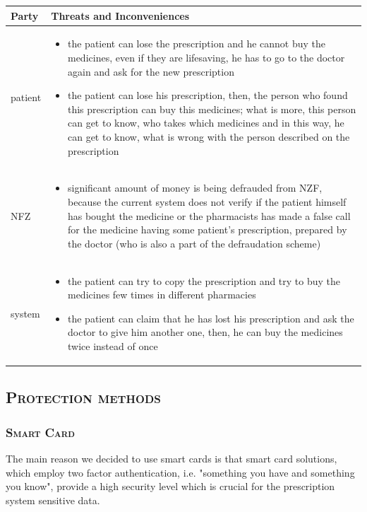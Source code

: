 \documentclass[12pt,titlepage]{article}
\begin{document}
\begin{tabularx}{\textwidth}{ |p{2.5cm}|X| }
	\hline
	\textbf{Party} &  \textbf{Threats and Inconveniences}\\
	\hline	
patient & \begin{itemize}
\item the patient can lose the prescription and he cannot buy the medicines, even if they are lifesaving, he has to go to the doctor again and ask for the new prescription
\item the patient can lose his prescription, then, the person who found this prescription can buy this medicines; what is more, this person can get to know, who takes which medicines and in this way, he can get to know, what is wrong with the person described on the prescription
\end{itemize} \\
\hline
	
NFZ & \begin{itemize}
\item significant amount of money is being defrauded from NZF, because the current system does not verify if the patient himself has bought the medicine or the pharmacists has made a false call for the medicine having some patient's prescription, prepared by the doctor (who is also a part of the defraudation scheme)
\end{itemize} \\
\hline

system & \begin{itemize}
\item the patient can try to copy the prescription and try to buy the medicines few times in different pharmacies
\item the patient can claim that he has lost his prescription and ask the doctor to give him another one, then, he can buy the medicines twice instead of once
\end{itemize} \\
\hline
\end{tabularx}

\subsection{\textsc{Protection methods}}
\subsubsection{\textsc{Smart Card}}
The main reason we decided to use smart cards is that smart card solutions, which employ two factor authentication, i.e. "something you have and something you know", provide a high security level which is crucial for the prescription system sensitive data.
\\
\end{document}
